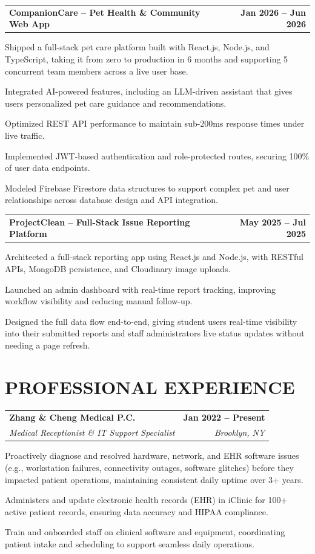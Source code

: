 \documentclass[letterpaper,10pt]{article}
\makeatletter
\newcommand{\rItem}[1]{\item\small\color{darknavy} #1}
\newcommand{\entryHead}[4]{%
  \vspace{2pt}%
  \begin{tabular*}{\textwidth}[t]{l@{\extracolsep{\fill}}r}
    \textbf{\color{darknavy}#1} & \textbf{\small\color{darkgray}#2}\\
    \textit{\small\color{darkgray}#3} & \textit{\small\color{darkgray}#4}\\
  \end{tabular*}\vspace{2pt}%
}
\newcommand{\entryHeadNoSub}[2]{%
  \vspace{2pt}%
  \begin{tabular*}{\textwidth}[t]{l@{\extracolsep{\fill}}r}
    \textbf{\color{darknavy}#1} & \textbf{\small\color{darkgray}#2}\\
  \end{tabular*}\vspace{2pt}%
}
\makeatother
\begin{document}
\entryHeadNoSub{CompanionCare -- Pet Health \& Community Web App}{Jan 2026 -- Jun 2026}
\begin{resumebullets}
  \rItem{Shipped a full-stack pet care platform built with React.js, Node.js, and TypeScript, taking it from zero to production in 6 months and supporting 5 concurrent team members across a live user base.}
  \rItem{Integrated AI-powered features, including an LLM-driven assistant that gives users personalized pet care guidance and recommendations.}
  \rItem{Optimized REST API performance to maintain sub-200ms response times under live traffic.}
  \rItem{Implemented JWT-based authentication and role-protected routes, securing 100\% of user data endpoints.}
  \rItem{Modeled Firebase Firestore data structures to support complex pet and user relationships across database design and API integration.}
\end{resumebullets}

\entryHeadNoSub{ProjectClean -- Full-Stack Issue Reporting Platform}{May 2025 -- Jul 2025}
\begin{resumebullets}
  \rItem{Architected a full-stack reporting app using React.js and Node.js, with RESTful APIs, MongoDB persistence, and Cloudinary image uploads.}
  \rItem{Launched an admin dashboard with real-time report tracking, improving workflow visibility and reducing manual follow-up.}
  \rItem{Designed the full data flow end-to-end, giving student users real-time visibility into their submitted reports and staff administrators live status updates without needing a page refresh.}
\end{resumebullets}
\vspace{0pt}

\section{PROFESSIONAL EXPERIENCE}

\entryHead{Zhang \& Cheng Medical P.C.}{Jan 2022 -- Present}{Medical Receptionist \& IT Support Specialist}{Brooklyn, NY}
\begin{resumebullets}
  \rItem{Proactively diagnose and resolved hardware, network, and EHR software issues (e.g., workstation failures, connectivity outages, software glitches) before they impacted patient operations, maintaining consistent daily uptime over 3+ years.}
  \rItem{Administers and update electronic health records (EHR) in iClinic for 100+ active patient records, ensuring data accuracy and HIPAA compliance.}
  \rItem{Train and onboarded staff on clinical software and equipment, coordinating patient intake and scheduling to support seamless daily operations.}
\end{resumebullets}
\vspace{0pt}
\end{document}
